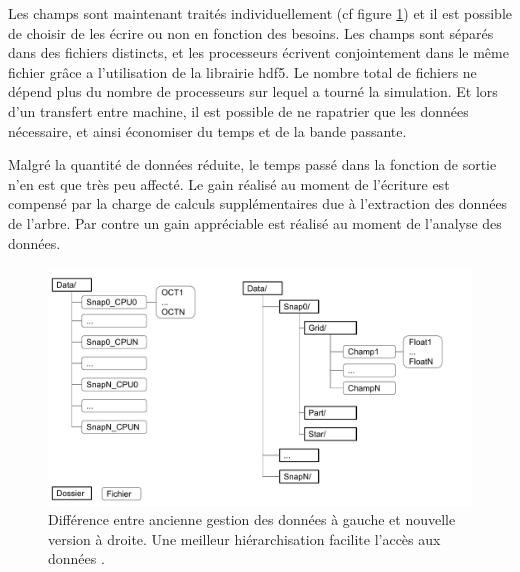 Les champs sont maintenant traités individuellement (cf figure \ref{fig:data}) et il est possible de choisir de les écrire ou non en fonction des besoins.
Les champs sont séparés dans des fichiers distincts, et les processeurs écrivent conjointement dans le même fichier grâce a l'utilisation de la librairie hdf5.
Le nombre total de fichiers ne dépend plus du nombre de processeurs sur lequel a tourné la simulation.
Et lors d'un transfert entre machine, il est possible de ne rapatrier que les données nécessaire, et ainsi économiser du temps et de la bande passante.

Malgré la quantité de données réduite, le temps passé dans la fonction de sortie n'en est que très peu affecté.
Le gain réalisé au moment de l'écriture est compensé par la charge de calculs supplémentaires due à l'extraction des données de l'arbre.
Par contre un gain appréciable est réalisé au moment de l'analyse des données.

\begin{figure}
        \includegraphics[width=.95\linewidth]{img/02/data.pdf} 
        \caption[Gestion des IO]{Différence entre ancienne gestion des données à gauche et nouvelle version à droite.
        Une meilleur hiérarchisation facilite l'accès aux données .
 		\label{fig:data}
 		}
\end{figure}





%


